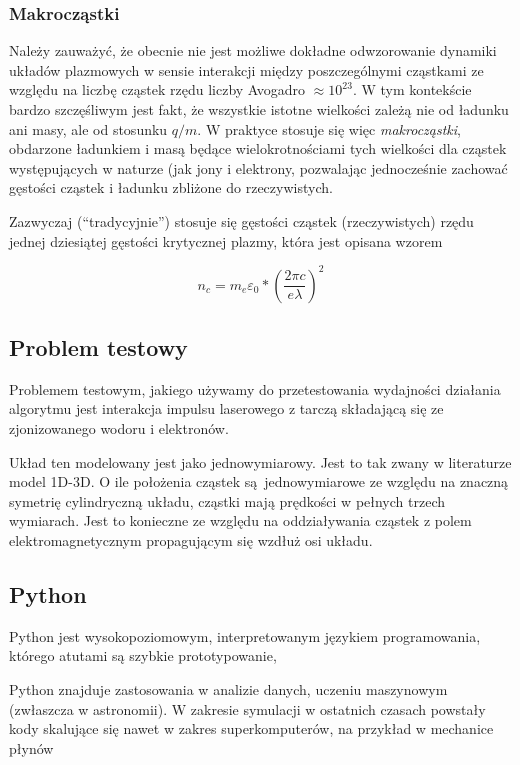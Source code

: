     \subsubsection{Makrocząstki}
    Należy zauważyć, że obecnie nie jest możliwe dokładne odwzorowanie dynamiki układów plazmowych w sensie interakcji
    między poszczególnymi cząstkami ze względu na liczbę cząstek rzędu liczby Avogadro $\approx 10^{23}$.
    W tym kontekście bardzo szczęśliwym jest fakt, że wszystkie istotne wielkości zależą nie od ładunku ani masy,
    ale od stosunku $q/m$. W praktyce stosuje się więc \emph{makrocząstki}, obdarzone ładunkiem i masą będące wielokrotnościami
    tych wielkości dla cząstek występujących w naturze (jak jony i elektrony, pozwalając jednocześnie zachować gęstości
    cząstek i ładunku 
    zbliżone do rzeczywistych.

    Zazwyczaj (``tradycyjnie'') stosuje się gęstości cząstek (rzeczywistych) rzędu jednej dziesiątej gęstości krytycznej plazmy,
    która jest opisana wzorem

    \begin{equation}
        n_c = m_e \varepsilon_0 * (\frac{2 \pi c}{e \lambda})^2
        \label{eqn:critical-density}
    \end{equation}

    \subsection{Problem testowy}

    Problemem testowym, jakiego używamy do przetestowania wydajności działania algorytmu jest
    interakcja impulsu laserowego z tarczą składającą się ze zjonizowanego wodoru i elektronów.

    Układ ten modelowany jest jako jednowymiarowy. Jest to tak zwany w literaturze model 1D-3D. O ile położenia cząstek
    są jednowymiarowe ze względu na znaczną symetrię
    cylindryczną układu, cząstki mają prędkości w pełnych trzech wymiarach. Jest to konieczne ze względu
    na oddziaływania cząstek z polem elektromagnetycznym propagującym się wzdłuż osi układu.

    \subsection{Python}
    Python jest wysokopoziomowym, interpretowanym językiem programowania, którego atutami są szybkie prototypowanie,

    Python znajduje zastosowania w analizie danych, uczeniu maszynowym (zwłaszcza w astronomii). W zakresie symulacji
    w ostatnich czasach powstały kody skalujące się nawet w zakres superkomputerów, na przykład w mechanice płynów 

